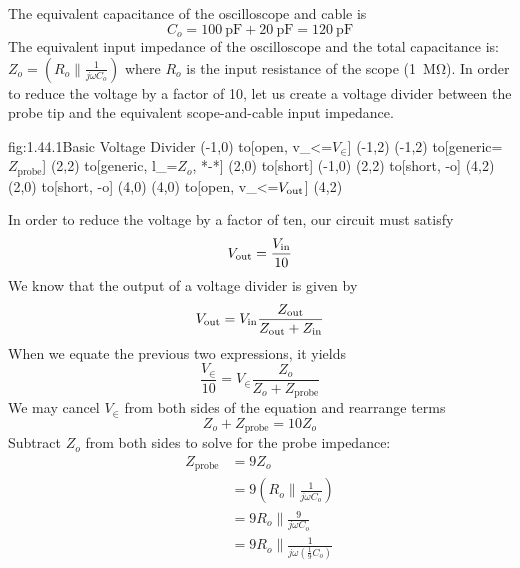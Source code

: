 












The equivalent capacitance of the oscilloscope and cable is
\[ C_o = \qty{100}{\pico\farad} + \qty{20}{\pico\farad} =  \qty{120}{\pico\farad}\]
The equivalent input impedance of the oscilloscope and the total capacitance is:
$Z_o = \left( R_o \parallel \frac{1}{j\omega C_o} \right)$
where $R_o$ is the input resistance of the scope (\qty{1}{\mega\ohm}).
In order to reduce the voltage by a factor of 10, let us create a voltage divider between the probe tip and the equivalent scope-and-cable input impedance.
\begin{circuit}{fig:1.44.1}{Basic Voltage Divider}
    (-1,0) to[open, v_<=$V_\in$] (-1,2)
    (-1,2) to[generic=$Z_{\text{probe}}$] (2,2)
    to[generic, l_=$Z_o$, *-*] (2,0)
    to[short] (-1,0)
    (2,2)  to[short, -o] (4,2)
    (2,0) to[short, -o] (4,0)
    (4,0) to[open, v_<=$V_{\text{out}}$] (4,2)
\end{circuit}
In order to reduce the voltage by a factor of ten, our circuit must satisfy
\[V_{\text{out}} = \frac{V_{\text{in}}}{10}\]
We know that the output of a voltage divider is given by
\[V_{\text{out}} = V_{\text{in}}\frac{Z_{\text{out}}}{Z_{\text{out}} + Z_{\text{in}}}\]
When we equate the previous two expressions, it yields
\[\frac{V_{\in}}{10} = V_{\in}\frac{Z_o}{Z_o + Z_{\text{probe}}}\]
We may cancel $V_{\in}$ from both sides of the equation and rearrange terms
\[Z_o + Z_{\text{probe}} = 10 Z_o\]
Subtract $Z_o$ from both sides to solve for the probe impedance:
\begin{align*}
    Z_{\text{probe}} &= 9 Z_o \\
    &= 9 \left( R_o \parallel \frac{1}{ j\omega C_o } \right) \\
    &= 9 R_o \parallel \frac{9}{ j\omega C_o } \\
    &= 9 R_o \parallel \frac{1}{ j\omega \left( \frac{1}{9} C_o \right) }
\end{align*}

